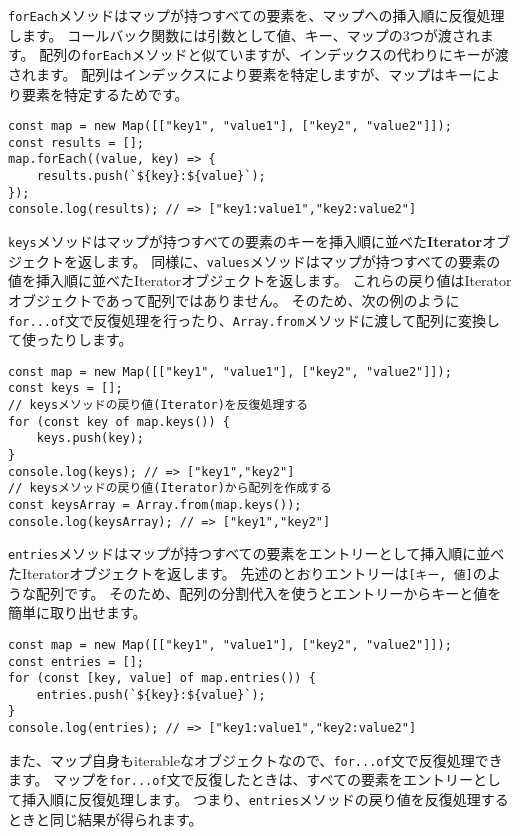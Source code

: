 \texttt{forEach}メソッドはマップが持つすべての要素を、マップへの挿入順に反復処理します。
コールバック関数には引数として値、キー、マップの3つが渡されます。
配列の\texttt{forEach}メソッドと似ていますが、インデックスの代わりにキーが渡されます。
配列はインデックスにより要素を特定しますが、マップはキーにより要素を特定するためです。

\begin{lstlisting}
const map = new Map([["key1", "value1"], ["key2", "value2"]]);
const results = [];
map.forEach((value, key) => {
    results.push(`${key}:${value}`);
});
console.log(results); // => ["key1:value1","key2:value2"]
\end{lstlisting}

\texttt{keys}メソッドはマップが持つすべての要素のキーを挿入順に並べた\textbf{Iterator}オブジェクトを返します。
同様に、\texttt{values}メソッドはマップが持つすべての要素の値を挿入順に並べたIteratorオブジェクトを返します。
これらの戻り値はIteratorオブジェクトであって配列ではありません。
そのため、次の例のように\texttt{for...of}文で反復処理を行ったり、\texttt{Array.from}メソッドに渡して配列に変換して使ったりします。

\begin{lstlisting}
const map = new Map([["key1", "value1"], ["key2", "value2"]]);
const keys = [];
// keysメソッドの戻り値(Iterator)を反復処理する
for (const key of map.keys()) {
    keys.push(key);
}
console.log(keys); // => ["key1","key2"]
// keysメソッドの戻り値(Iterator)から配列を作成する
const keysArray = Array.from(map.keys());
console.log(keysArray); // => ["key1","key2"]
\end{lstlisting}

\texttt{entries}メソッドはマップが持つすべての要素をエントリーとして挿入順に並べたIteratorオブジェクトを返します。
先述のとおりエントリーは\texttt{[キー, 値]}のような配列です。
そのため、配列の分割代入を使うとエントリーからキーと値を簡単に取り出せます。

\begin{lstlisting}
const map = new Map([["key1", "value1"], ["key2", "value2"]]);
const entries = [];
for (const [key, value] of map.entries()) {
    entries.push(`${key}:${value}`);
}
console.log(entries); // => ["key1:value1","key2:value2"]
\end{lstlisting}

また、マップ自身もiterableなオブジェクトなので、\texttt{for...of}文で反復処理できます。
マップを\texttt{for...of}文で反復したときは、すべての要素をエントリーとして挿入順に反復処理します。
つまり、\texttt{entries}メソッドの戻り値を反復処理するときと同じ結果が得られます。

